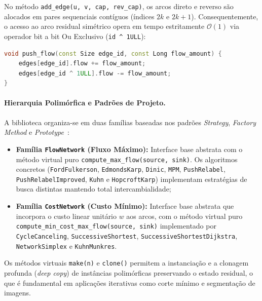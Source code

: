\documentclass[12pt,a4paper]{article}
\begin{document}
No método \lstinline{add_edge(u, v, cap, rev_cap)}, os arcos direto e reverso são alocados em pares sequenciais contíguos (índices $2k$ e $2k+1$). Consequentemente, o acesso ao arco residual simétrico opera em tempo estritamente $\mathcal{O}(1)$ via operador bit a bit Ou Exclusivo (\lstinline{id ^ 1ULL}):
\begin{lstlisting}[language=C++, numbers=none, basicstyle=\ttfamily\footnotesize, frame=none, backgroundcolor=\color{white}]
void push_flow(const Size edge_id, const Long flow_amount) {
    edges[edge_id].flow += flow_amount;
    edges[edge_id ^ 1ULL].flow -= flow_amount;
}
\end{lstlisting}

\paragraph{Hierarquia Polimórfica e Padrões de Projeto.}
A biblioteca organiza-se em duas famílias baseadas nos padrões \textit{Strategy}, \textit{Factory Method} e \textit{Prototype}~\cite{gamma1994design}:
\begin{itemize}
    \item \textbf{Família \lstinline{FlowNetwork} (Fluxo Máximo):} Interface base abstrata com o método virtual puro \lstinline{compute_max_flow(source, sink)}. Os algoritmos concretos (\lstinline{FordFulkerson}, \lstinline{EdmondsKarp}, \lstinline{Dinic}, \lstinline{MPM}, \lstinline{PushRelabel}, \lstinline{PushRelabelImproved}, \lstinline{Kuhn} e \lstinline{HopcroftKarp}) implementam estratégias de busca distintas mantendo total intercambialidade;
    \item \textbf{Família \lstinline{CostNetwork} (Custo Mínimo):} Interface base abstrata que incorpora o custo linear unitário $w$ aos arcos, com o método virtual puro \lstinline{compute_min_cost_max_flow(source, sink)} implementado por \lstinline{CycleCanceling}, \lstinline{SuccessiveShortest}, \lstinline{SuccessiveShortestDijkstra}, \lstinline{NetworkSimplex} e \lstinline{KuhnMunkres}.
\end{itemize}

Os métodos virtuais \lstinline{make(n)} e \lstinline{clone()} permitem a instanciação e a clonagem profunda (\textit{deep copy}) de instâncias polimórficas preservando o estado residual, o que é fundamental em aplicações iterativas como corte mínimo e segmentação de imagens.

\newpage

\label{ap:flownetwork}
\end{document}
